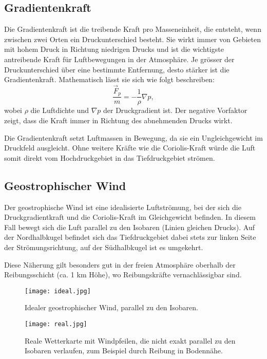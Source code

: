 \subsection{Gradientenkraft
\label{geostrophisch:subsection:gradient}}
Die Gradientenkraft ist die treibende Kraft pro Masseneinheit, die entsteht, wenn zwischen zwei Orten ein Druckunterschied besteht. Sie wirkt immer von Gebieten mit hohem Druck in Richtung niedrigen Drucks und ist die wichtigste antreibende Kraft für Luftbewegungen in der Atmosphäre. Je grösser der Druckunterschied über eine bestimmte Entfernung, desto stärker ist die Gradientenkraft.
Mathematisch lässt sie sich wie folgt beschreiben:
\begin{equation}
\frac{\vec{F}_p} {m}
= 
-\frac{1}{\rho} \nabla p
\label{geostrophisch:equation4},
\end{equation}
wobei $\rho$ die Luftdichte und $\nabla p$ der Druckgradient ist. 
Der negative Vorfaktor zeigt, dass die Kraft immer in Richtung des abnehmenden Drucks wirkt.

Die Gradientenkraft setzt Luftmassen in Bewegung, da sie ein Ungleichgewicht im Druckfeld ausgleicht. Ohne weitere Kräfte wie die Coriolis-Kraft würde die Luft somit direkt vom Hochdruckgebiet in das Tiefdruckgebiet strömen.
\subsection{Geostrophischer Wind}

Der geostrophische Wind ist eine idealisierte Luftströmung, bei der sich die Druckgradientkraft und die Coriolis-Kraft im Gleichgewicht befinden. In diesem Fall bewegt sich die Luft parallel zu den Isobaren (Linien gleichen Drucks). Auf der Nordhalbkugel befindet sich das Tiefdruckgebiet dabei stets zur linken Seite der Strömungsrichtung, auf der Südhalbkugel ist es umgekehrt.

Diese Näherung gilt besonders gut in der freien Atmosphäre oberhalb der Reibungsschicht (ca. 1 km Höhe), wo Reibungskräfte vernachlässigbar sind. 

\begin{figure}
    	\centering
    	\texttt{[image: ideal.jpg]}
  	 \caption{Idealer geostrophischer Wind, parallel zu den Isobaren.}
   	\label{bild:ideal}
\end{figure}

\begin{figure}
    	\centering
    	\texttt{[image: real.jpg]}
  	 \caption{Reale Wetterkarte mit Windpfeilen, die nicht exakt parallel zu den Isobaren verlaufen, zum Beispiel durch Reibung in Bodennähe.}
   	\label{bild:real}
\end{figure}

